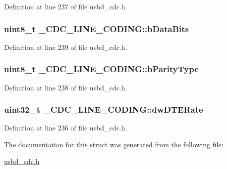 Definition at line 237 of file usbd\+\_\+cdc.\+h.

\subsubsection[{\texorpdfstring{b\+Data\+Bits}{bDataBits}}]{\setlength{\rightskip}{0pt plus 5cm}uint8\+\_\+t \+\_\+\+C\+D\+C\+\_\+\+L\+I\+N\+E\+\_\+\+C\+O\+D\+I\+N\+G\+::b\+Data\+Bits}\hypertarget{struct__CDC__LINE__CODING_a6764726aafd5b442bf5a1ecb39ffeb96}{}\label{struct__CDC__LINE__CODING_a6764726aafd5b442bf5a1ecb39ffeb96}


Definition at line 239 of file usbd\+\_\+cdc.\+h.

\subsubsection[{\texorpdfstring{b\+Parity\+Type}{bParityType}}]{\setlength{\rightskip}{0pt plus 5cm}uint8\+\_\+t \+\_\+\+C\+D\+C\+\_\+\+L\+I\+N\+E\+\_\+\+C\+O\+D\+I\+N\+G\+::b\+Parity\+Type}\hypertarget{struct__CDC__LINE__CODING_a737b276dd2599610b3cf4783c80e725c}{}\label{struct__CDC__LINE__CODING_a737b276dd2599610b3cf4783c80e725c}


Definition at line 238 of file usbd\+\_\+cdc.\+h.

\subsubsection[{\texorpdfstring{dw\+D\+T\+E\+Rate}{dwDTERate}}]{\setlength{\rightskip}{0pt plus 5cm}uint32\+\_\+t \+\_\+\+C\+D\+C\+\_\+\+L\+I\+N\+E\+\_\+\+C\+O\+D\+I\+N\+G\+::dw\+D\+T\+E\+Rate}\hypertarget{struct__CDC__LINE__CODING_aeca9d053bfd185bc6b70911197442398}{}\label{struct__CDC__LINE__CODING_aeca9d053bfd185bc6b70911197442398}


Definition at line 236 of file usbd\+\_\+cdc.\+h.



The documentation for this struct was generated from the following file\+:\begin{DoxyCompactItemize}
\item 
\hyperlink{usbd__cdc_8h}{usbd\+\_\+cdc.\+h}\end{DoxyCompactItemize}
